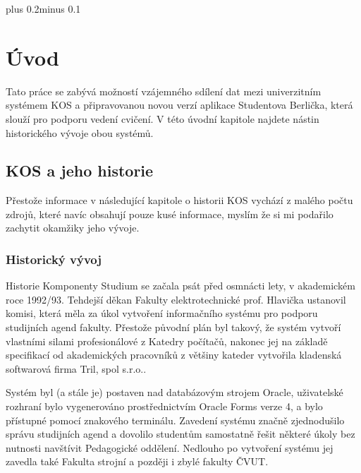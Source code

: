 \documentclass[11pt,twoside,a4paper]{book}
\begin{document}
\mainbodystarts
\fontsize{11pt}{15pt}\selectfont
{}\baselineskip plus 0.2\baselineskip minus 0.1\baselineskip



\chapter{Úvod}

Tato práce se zabývá možností vzájemného sdílení dat mezi univerzitním systémem KOS a připravovanou novou verzí aplikace Studentova Berlička, která slouží pro podporu vedení cvičení. V této úvodní kapitole najdete nástin historického vývoje obou systémů.

\section{KOS a jeho historie}
Přestože informace v následující kapitole o historii KOS vychází z malého počtu zdrojů, které navíc obsahují pouze kusé informace, myslím že si mi podařilo zachytit okamžiky jeho vývoje.

\subsection{Historický vývoj}
Historie Komponenty Studium se začala psát před osmnácti lety, v akademickém roce 1992/93\cite{forum:historie-kos}. Tehdejší děkan Fakulty elektrotechnické prof. Hlavička ustanovil komisi, která měla za úkol vytvoření informačního systému pro podporu studijních agend fakulty. Přestože původní plán byl takový, že systém vytvoří vlastními silami profesionálové z Katedry počítačů, nakonec jej na základě specifikací od akademických pracovníků z většiny kateder vytvořila kladenská softwarová firma Tril, spol s.r.o.\cite{forum:neocekavana}.

Systém byl (a stále je) postaven nad databázovým strojem Oracle, uživatelské rozhraní bylo vygenerováno prostřednictvím Oracle Forms verze 4, a bylo přístupné pomocí znakového terminálu. Zavedení systému značně zjednodušilo správu studijních agend a dovolilo studentům samostatně řešit některé úkoly bez nutnosti navštívit Pedagogické oddělení. Nedlouho po vytvoření systému jej zavedla také Fakulta strojní a později i zbylé fakulty ČVUT.
\end{document}
